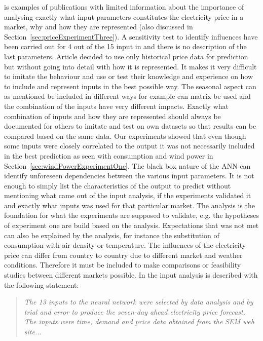 \cite{szkuta1999electricity,sansom1999neural,1} is examples of publications with limited information about the importance of analysing exactly what input parameters constitutes the electricity price in a market, why and how they are represented (also discussed in Section~\ref{sec:priceExperimentThree}). A sensitivity test to identify influences have been carried out for 4 out of the 15 input in \cite{szkuta1999electricity} and there is no description of the last parameters. Article \cite{1} decided to use only historical price data for prediction but without going into detail with how it is represented. It makes it very difficult to imitate the behaviour and use or test their knowledge and experience on how to include and represent inputs in the best possible way. The seasonal aspect can as mentioned be included in different ways for example can matrix be used and the combination of the inputs have very different impacts. Exactly what combination of inputs and how they are represented should always be documented for others to imitate and test on own datasets so that results can be compared based on the same data. Our experiments showed that even though some inputs were closely correlated to the output it was not necessarily included in the best prediction as seen with consumption and wind power in Section~\ref{sec:windPowerExperimentOne}. The black box nature of the ANN can identify unforeseen dependencies between the various input parameters. It is not enough to simply list the characteristics of the output to predict without mentioning what came out of the input analysis, if the experiments validated it and exactly what inputs was used for that particular market. The analysis is the foundation for what the experiments are supposed to validate, e.g. the hypotheses of experiment one are build based on the analysis. Expectations that was not met can also be explained by the analysis, for instance the substitution of consumption with air density or temperature. The influences of the electricity price can differ from country to country due to different market and weather conditions. Therefore it must be included to make comparisons or feasibility studies between different markets possible. In \cite{sansom1999neural} the input analysis is described with the following statement:

\begin{quotation}
\textit{The 13 inputs to the neural network were selected by data analysis and by trial and error to produce the seven-day ahead electricity price forecast. The inputs were time, demand and price data obtained from the SEM web site...}
\end{quotation}

